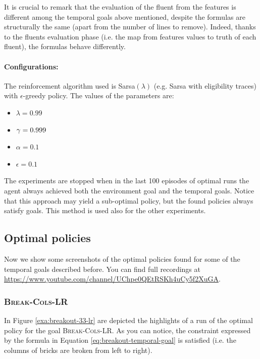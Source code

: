 It is crucial to remark that the evaluation of the fluent from the features is different among the temporal goals above mentioned, despite the formulas are structurally the same (apart from the number of lines to remove). Indeed, thanks to the fluents evaluation phase (i.e. the map from features values to truth of each fluent), the formulas behave differently.

\paragraph{Configurations:}
The reinforcement algorithm used is Sarsa$(\lambda)$ (e.g. Sarsa with eligibility traces) with $\epsilon$-greedy policy. The values of the parameters are:
\begin{itemize}
	 \item $\lambda = 0.99$
	 \item $\gamma=0.999$	
	 \item $\alpha=0.1$
	 \item $\epsilon= 0.1$
\end{itemize}

The experiments are stopped when in the last 100 episodes of optimal runs the agent always achieved both the environment goal and the temporal goals.
Notice that this approach may yield a sub-optimal policy, but the found policies always satisfy \LLf goals. This method is used also for the other experiments.

\subsection{Optimal policies}
Now we show some screenshots of the optimal policies found for some of the temporal goals described before. You can find full recordings at \url{https://www.youtube.com/channel/UChpe0QEtRSKh4uCy5f2XuGA}.

\subsubsection{\textsc{Break-Cols-LR}}
In Figure \ref{exa:breakout-33-lr} are depicted the highlights of a run of the optimal policy for the goal \textsc{Break-Cols-LR}. As you can notice, the constraint expressed by the formula in Equation \ref{eq:breakout-temporal-goal} is satisfied (i.e. the columns of bricks are broken from left to right).

